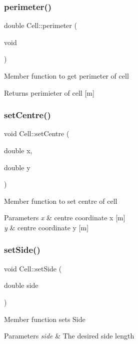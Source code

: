 \subsubsection{\texorpdfstring{perimeter()}{perimeter()}}
{\footnotesize\ttfamily double Cell\+::perimeter (\begin{DoxyParamCaption}\item[{void}]{ }\end{DoxyParamCaption})}

Member function to get perimeter of cell \begin{DoxyReturn}{Returns}
perimieter of cell \mbox{[}m\mbox{]} 
\end{DoxyReturn}
\mbox{\label{classCell_a882f75366d9cf6477d1fd7f9dd54519b}} 
\subsubsection{\texorpdfstring{set\+Centre()}{setCentre()}}
{\footnotesize\ttfamily void Cell\+::set\+Centre (\begin{DoxyParamCaption}\item[{double}]{x,  }\item[{double}]{y }\end{DoxyParamCaption})}

Member function to set centre of cell 
\begin{DoxyParams}{Parameters}
{\em x} & centre coordinate x \mbox{[}m\mbox{]} \\
\hline
{\em y} & centre coordinate y \mbox{[}m\mbox{]} \\
\hline
\end{DoxyParams}
\mbox{\label{classCell_a9c4fd400ffbf61fe18073f3b244614ab}} 
\subsubsection{\texorpdfstring{set\+Side()}{setSide()}}
{\footnotesize\ttfamily void Cell\+::set\+Side (\begin{DoxyParamCaption}\item[{double}]{side }\end{DoxyParamCaption})}

Member function sets Side 
\begin{DoxyParams}{Parameters}
{\em side} & The desired side length \\
\hline
\end{DoxyParams}
\mbox{\label{classCell_adeb7a033171fa07557e756f3fcc4717d}} 
